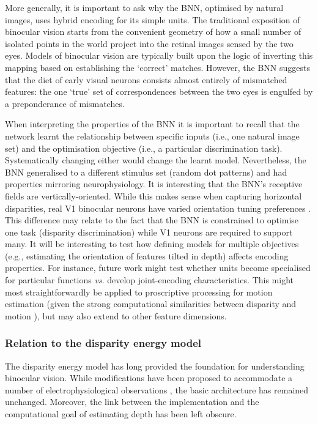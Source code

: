 More generally, it is important to ask why the BNN, optimised by natural images, uses hybrid encoding for its simple units. The traditional exposition of binocular vision starts from the convenient geometry of how a small number of isolated points in the world project into the retinal images sensed by the two eyes. Models of binocular vision are typically built upon the logic of inverting this mapping based on establishing the `correct' matches. However, the BNN suggests that the diet of early visual neurons consists almost entirely of mismatched features: the one `true' set of correspondences between the two eyes is engulfed by a preponderance of mismatches. 

When interpreting the properties of the BNN it is important to recall that the network learnt the relationship between specific inputs (i.e., one natural image set) and the optimisation objective (i.e., a particular discrimination task). Systematically changing either would change the learnt model. Nevertheless, the BNN generalised to a different stimulus set (random dot patterns) and had properties mirroring neurophysiology. It is interesting that the BNN's receptive fields are vertically-oriented. While this makes sense when capturing horizontal disparities, real V1 binocular neurons have varied orientation tuning preferences \cite{DeAngelis:1991mb}. This difference may relate to the fact that the BNN is constrained to optimise one task (disparity discrimination) while V1 neurons are required to support many. It will be interesting to test how defining models for multiple objectives (e.g., estimating the orientation of features tilted in depth) affects encoding properties. For instance, future work might test whether units become specialised for particular functions {\it vs}. develop joint-encoding characteristics. This might most straightforwardly be applied to proscriptive processing for motion estimation (given the strong computational similarities between disparity and motion \cite{Anzai:2001wi}), but may also extend to other feature dimensions.

\subsubsection*{Relation to the disparity energy model}

The disparity energy model \cite{Ohzawa:1990cq, Fleet:1996tq, Qian:1997bu} has long provided the foundation for understanding binocular vision. While modifications have been proposed to accommodate a number of electrophysiological observations \cite{Read:2002kx,Haefner:2008jg,Samonds:2013cs}, the basic architecture has remained unchanged. Moreover, the link between the implementation and the computational goal of estimating depth has been left obscure.

